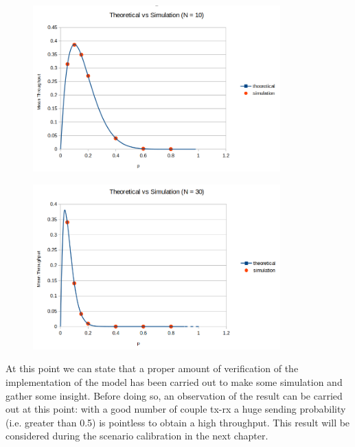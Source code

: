 \begin{figure}[H]
	\centering
	\includegraphics[width=0.85\textwidth]{img/SecondVerificationN10.png}
\end{figure}
\begin{figure}[H]
	\centering
	\includegraphics[width=0.85\textwidth]{img/SecondVerificationN30.png}
\end{figure}

\noindent At this point we can state that a proper amount of verification of the implementation of the model has been carried out to make some simulation and gather some insight. Before doing so, an observation of the result can be carried out at this point: with a good number of couple tx-rx a huge sending probability (i.e. greater than 0.5) is pointless to obtain a high throughput. This result will be considered during the scenario calibration in the next chapter. 
